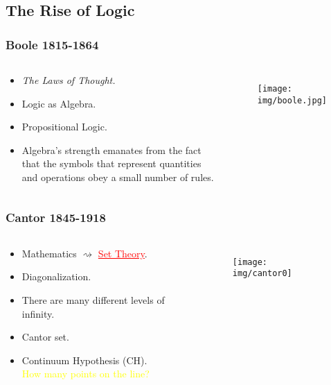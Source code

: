 \documentclass[UTF8,aspectratio=43,11pt,colorlinks,compress,openany]{beamer}%
\begin{document}
\subsection{The Rise of Logic}

\begin{frame}\frametitle{Boole 1815-1864}
	\begin{columns}
			\begin{block}{}
				\begin{itemize}
					\item \emph{The Laws of Thought.}
					\item Logic as Algebra.
					\item Propositional Logic.
					\item Algebra's strength emanates from the fact that the symbols that represent quantities and operations obey a small number of rules.
				\end{itemize}
			\end{block}
		\vspace{-2ex}
			\begin{figure}
				\texttt{[image: img/boole.jpg]}
			\end{figure}
	\end{columns}
\end{frame}

\begin{frame}\frametitle{Cantor 1845-1918}
	\begin{columns}
		\column{0.72\textwidth}
			\begin{center}
				\begin{block}{}
					\begin{itemize}
						\item Mathematics $\rightsquigarrow$ \textcolor{red}{\underline{Set Theory}}.
						\item Diagonalization.
						\item There are many different levels of infinity.
						\item Cantor set.
						\item Continuum Hypothesis (CH).\\
						\textcolor{yellow}{How many points on the line?}
					\end{itemize}
				\end{block}
			\end{center}
		\column{0.2\textwidth}
			\begin{figure}
				\texttt{[image: img/cantor0]}
			\end{figure}
	\end{columns}
\end{frame}
\end{document}
